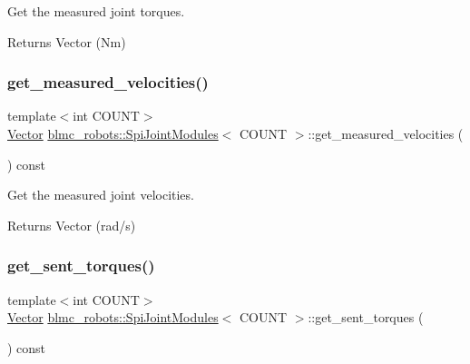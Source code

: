 Get the measured joint torques. 

\begin{DoxyReturn}{Returns}
Vector (Nm) 
\end{DoxyReturn}
\mbox{\label{classblmc__robots_1_1SpiJointModules_a3857a40c65dda1200c37a7f58e87fc6b}} 
\subsubsection{\texorpdfstring{get\+\_\+measured\+\_\+velocities()}{get\_measured\_velocities()}}
{\footnotesize\ttfamily template$<$int C\+O\+U\+NT$>$ \\
\hyperlink{classblmc__robots_1_1SpiJointModules_a2d48f81ec41a42a240e80cd22d4fa2f8}{Vector} \hyperlink{classblmc__robots_1_1SpiJointModules}{blmc\+\_\+robots\+::\+Spi\+Joint\+Modules}$<$ C\+O\+U\+NT $>$\+::get\+\_\+measured\+\_\+velocities (\begin{DoxyParamCaption}{ }\end{DoxyParamCaption}) const\hspace{0.3cm}{\ttfamily [inline]}}



Get the measured joint velocities. 

\begin{DoxyReturn}{Returns}
Vector (rad/s) 
\end{DoxyReturn}
\mbox{\label{classblmc__robots_1_1SpiJointModules_a832ad3d4c2817bd20f50109d628d70b0}} 
\subsubsection{\texorpdfstring{get\+\_\+sent\+\_\+torques()}{get\_sent\_torques()}}
{\footnotesize\ttfamily template$<$int C\+O\+U\+NT$>$ \\
\hyperlink{classblmc__robots_1_1SpiJointModules_a2d48f81ec41a42a240e80cd22d4fa2f8}{Vector} \hyperlink{classblmc__robots_1_1SpiJointModules}{blmc\+\_\+robots\+::\+Spi\+Joint\+Modules}$<$ C\+O\+U\+NT $>$\+::get\+\_\+sent\+\_\+torques (\begin{DoxyParamCaption}{ }\end{DoxyParamCaption}) const\hspace{0.3cm}{\ttfamily [inline]}}




